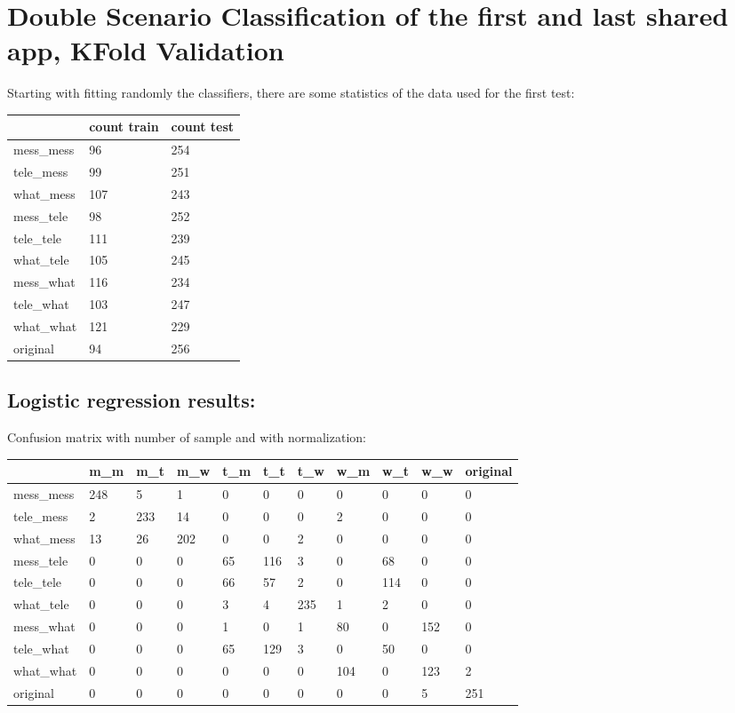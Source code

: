 

\chapter{Double Scenario Classification of the first and last shared app, KFold Validation}

Starting with fitting randomly the classifiers, there are some statistics of the data used for the first test: \\
 {\def\arraystretch{1.3} 
 \begin{table}[H] 
\centering 
\begin{tabular}{|l|l|l|} 
\hline 
  &count train  &count test  \\ \hline
mess\_mess  &96  &254  \\ \hline
tele\_mess  &99  &251  \\ \hline
what\_mess  &107  &243  \\ \hline
mess\_tele  &98  &252  \\ \hline
tele\_tele  &111  &239  \\ \hline
what\_tele  &105  &245  \\ \hline
mess\_what  &116  &234  \\ \hline
tele\_what  &103  &247  \\ \hline
what\_what  &121  &229  \\ \hline
original  &94  &256  \\ \hline
\end{tabular} 
\end{table} }
\section{Logistic regression results:} 
Confusion matrix with number of sample and with normalization:
 {\def\arraystretch{1.3} 
 \begin{table}[H] 
\centering 
\begin{tabular}{|l|l|l|l|l|l|l|l|l|l|l|} 
\hline 
  &m\_m  &m\_t  &m\_w  &t\_m  &t\_t  &t\_w  &w\_m  &w\_t  &w\_w  &original  \\ \hline
mess\_mess  &248  &5  &1  &0  &0  &0  &0  &0  &0  &0  \\ \hline
tele\_mess  &2  &233  &14  &0  &0  &0  &2  &0  &0  &0  \\ \hline
what\_mess  &13  &26  &202  &0  &0  &2  &0  &0  &0  &0  \\ \hline
mess\_tele  &0  &0  &0  &65  &116  &3  &0  &68  &0  &0  \\ \hline
tele\_tele  &0  &0  &0  &66  &57  &2  &0  &114  &0  &0  \\ \hline
what\_tele  &0  &0  &0  &3  &4  &235  &1  &2  &0  &0  \\ \hline
mess\_what  &0  &0  &0  &1  &0  &1  &80  &0  &152  &0  \\ \hline
tele\_what  &0  &0  &0  &65  &129  &3  &0  &50  &0  &0  \\ \hline
what\_what  &0  &0  &0  &0  &0  &0  &104  &0  &123  &2  \\ \hline
original  &0  &0  &0  &0  &0  &0  &0  &0  &5  &251  \\ \hline
\end{tabular} 
\end{table} }

